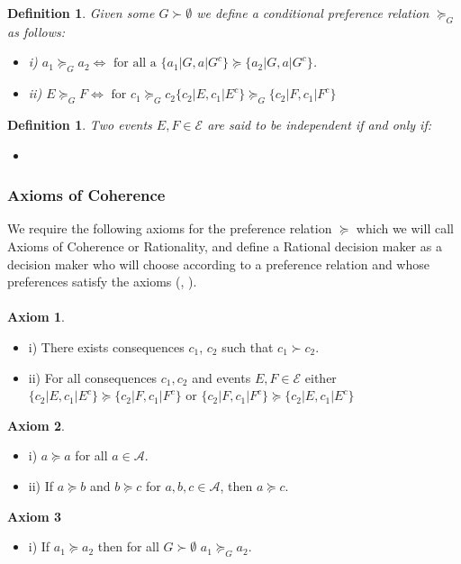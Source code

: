 \documentclass[11pt]{article}
\theoremstyle{plain}
\newtheorem{defi}[teo]{Definition}
\begin{document}
	\begin{defi}
	Given some $G \succ \emptyset$ we define a conditional preference relation $\succeq_G$ as follows:
	\begin{itemize}
	\item i) $a_1 \succeq_G a_2 \Leftrightarrow \textrm{ for all a } \{ a_1 | G, a | G^c \} \succeq \{ a_2 | G, a | G^c \}$.
	\item ii) $E \succeq_G F \Leftrightarrow \textrm{ for } c_1 \succeq_G c_2 \{ c_2 | E , c_1 | E^c \} \succeq_G \{c_2 | F , c_1  | F^c \}$ 
	\end{itemize}
	\end{defi}
	\begin{defi}
	Two events $E,F \in \mathcal{E}$ are said to be independent if and only if:
	\begin{itemize}
	\item 	
	\end{itemize}
	\end{defi}
	\subsubsection{Axioms of Coherence}
	We require the following axioms for the preference relation $\succeq$ which we will call Axioms of Coherence or Rationality, and define a Rational decision maker as a decision maker who will choose according to a preference relation and whose preferences satisfy the axioms (\cite{bernardo2000bayesian}, \cite{gilboa2009decision}).\\
	\\
	\indent \textbf{Axiom 1}.
	\begin{itemize}
	\item i) There exists consequences $c_1$, $c_2$ such that $c_1 \succ c_2$.
	\item ii) For all consequences $c_1, c_2$ and events $E,F \in \mathcal{E}$ either $\{  c_2 | E , c_1 | E^c\} \succeq \{ c_2 | F, c_1 | F^c \}$ or $\{ c_2 | F, c_1 | F^c \} \succeq \{  c_2 | E , c_1 | E^c\}$
	\end{itemize}
	
	\textbf{Axiom 2}.
	\begin{itemize}
	\item i) $a \succeq a$ for all $a \in \mathcal{A}$.
	\item ii) If $a \succeq b$ and $b \succeq c$ for $a,b,c \in \mathcal{A}$, then $a \succeq c$.
	\end{itemize}
	
	\textbf{Axiom 3}
	\begin{itemize}
	\item i) If $a_1 \succeq a_2$ then for all $G \succ \emptyset$ $a_1 \succeq_G a_2$.
	\end{itemize}
	
\end{document}
